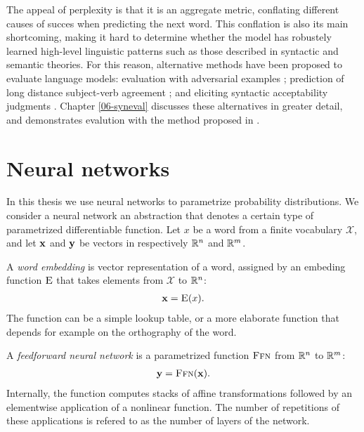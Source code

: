    The appeal of perplexity is that it is an aggregate metric, conflating different causes of succes when predicting the next word. This conflation is also its main shortcoming, making it hard to determine whether the model has robustely learned high-level linguistic patterns such as those described in syntactic and semantic theories. For this reason, alternative methods have been proposed to evaluate language models: evaluation with adversarial examples \citep{smith2012adversarial}; prediction of long distance subject-verb agreement \citep{linzen2016syntax}; and eliciting syntactic acceptability judgments \citep{linzen2018targeted}. Chapter \ref{06-syneval} discusses these alternatives in greater detail, and demonstrates evalution with the method proposed in \citep{linzen2018targeted}.


\section{Neural networks}

  In this thesis we use neural networks to parametrize probability distributions. We consider a neural network an abstraction that denotes a certain type of parametrized differentiable function. Let $x$ be a word from a finite vocabulary $\mathcal{X}$, and let $\mathbf{x}$ and $\mathbf{y}$ be vectors in respectively $\mathbb{R}^{n}$ and $\mathbb{R}^{m}$.

  \begin{definition}{} A \textit{word embedding} is vector representation of a word, assigned by an embeding function $\textsc{E}$ that takes elements from $\mathcal{X}$ to $\mathbb{R}^{n}$:
  \begin{align*}
    \mathbf{x} = \textsc{E}( x ).
  \end{align*}
  The function can be a simple lookup table, or a more elaborate function that depends for example on the orthography of the word.
  \end{definition}

  \begin{definition}{} A \textit{feedforward neural network} is a parametrized function $\textsc{Ffn}$ from $\mathbb{R}^{n}$ to $\mathbb{R}^{m}$:
  \begin{align*}
    \mathbf{y} = \textsc{Ffn}( \mathbf{x} ).
  \end{align*}
  Internally, the function computes stacks of affine transformations followed by an elementwise application of a nonlinear function. The number of repetitions of these applications is refered to as the number of layers of the network.
  \end{definition}

